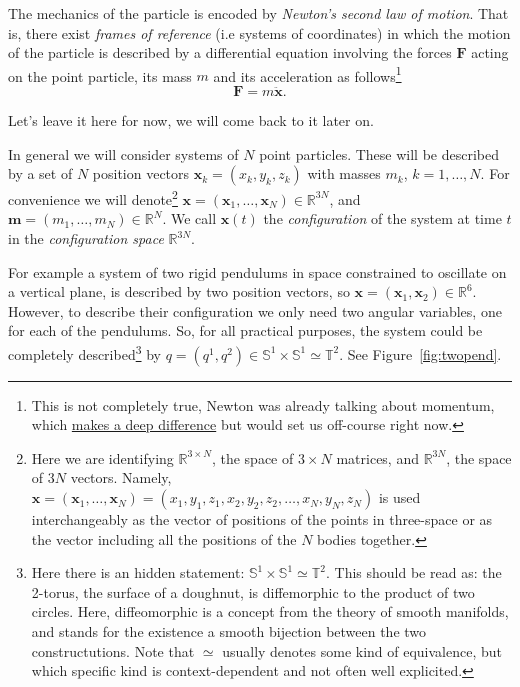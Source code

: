 \documentclass[english,fontsize=11pt,paper=a5,oneside]{scrbook}
\newcommand{\R}{\mathbb{R}}
\newcommand{\T}{\mathbb{T}}
\newcommand{\bS}{\mathbb{S}}
\newcommand{\bx}{\bm{x}}
\theoremstyle{definition}
\newenvironment{example}
  {\pushQED{\qed}\renewcommand{\qedsymbol}{$\lozenge$}\examplex}
  {\popQED\endexamplex}
\begin{document}
\begin{tcolorbox}
  The mechanics of the particle is encoded by \emph{Newton's second law of motion}.
  That is, there exist \emph{frames of reference} (i.e systems of coordinates) in which the motion of the particle is described by a differential equation involving the forces $\bm{F}$ acting on the point particle, its mass $m$ and its acceleration as follows\footnote{This is not completely true, Newton was already talking about momentum, which \href{https://web.archive.org/web/20211201082909/https://bigthink.com/starts-with-a-bang/most-important-equation-physics/}{makes a deep difference} but would set us off-course right now.}
  \begin{equation}\label{eq:newton}
    \bm F = m \ddot{\bx}.
  \end{equation}
\end{tcolorbox}
Let's leave it here for now, we will come back to it later on.
\medskip

In general we will consider systems of $N$ point particles.
These will be described by a set of $N$ position vectors $\bx_k = (x_k, y_k ,z_k)$ with masses $m_k$, $k = 1, \ldots, N$.
For convenience we will denote\footnote{Here we are identifying $\R^{3\times N}$, the space of $3\times N$ matrices, and $\R^{3N}$, the space of $3N$ vectors. Namely, $\bx = (\bx_1, \ldots, \bx_N) = (x_1, y_1, z_1, x_2, y_2, z_2, \ldots, x_N, y_N, z_N)$ is used interchangeably as the vector of positions of the points in three-space or as the vector including all the positions of the $N$ bodies together.} $\bx = (\bx_1, \ldots, \bx_N)\in\R^{3N}$, and $\bm{m} = (m_1, \ldots, m_N)\in\R^N$.
We call $\bx(t)$ the \emph{configuration} of the system at time $t$ in the \emph{configuration space} $\R^{3N}$.

\begin{example}\label{example:gcoords}
  For example a system of two rigid pendulums in space constrained to oscillate on a vertical plane, is described by two position vectors, so $\bx = (\bx_1, \bx_2)\in\R^{6}$.
  However, to describe their configuration we only need two angular variables, one for each of the pendulums. So, for all practical purposes, the system could be completely described\footnote{Here there is an hidden statement: $\bS^1\times\bS^1 \simeq \T^2$. This should be read as: the 2-torus, the surface of a doughnut, is diffemorphic to the product of two circles. Here, diffeomorphic is a concept from the theory of smooth manifolds, and stands for the existence a smooth bijection between the two constructutions. Note that $\simeq$ usually denotes some kind of equivalence, but which specific kind is context-dependent and not often well explicited.} by $q = (q^1, q^2) \in \bS^1\times\bS^1 \simeq \T^2$. See Figure~\ref{fig:twopend}.
\end{example}
\end{document}

